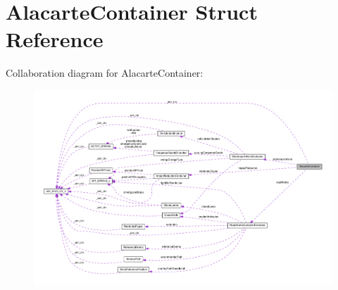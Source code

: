 \hypertarget{structAlacarteContainer}{}\section{Alacarte\+Container Struct Reference}
\label{structAlacarteContainer}


Collaboration diagram for Alacarte\+Container\+:\nopagebreak
\begin{figure}[H]
\begin{center}
\leavevmode
\includegraphics[width=350pt]{structAlacarteContainer__coll__graph}
\end{center}
\end{figure}
